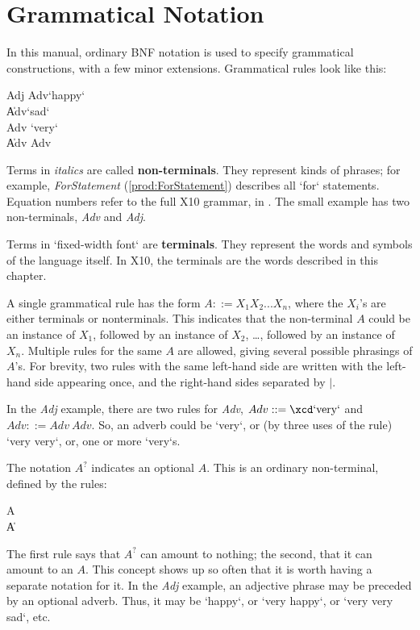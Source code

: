\section{Grammatical Notation}

In this manual, ordinary BNF notation is used to specify grammatical
constructions, with a few minor extensions. 
Grammatical rules look like this: \\
\begin{bbgrammar}
Adj \: Adv\opt \mbox{\xcd`happy`}\\
    \| Adv\opt \mbox{\xcd`sad`}\\ 
Adv \: \mbox{\xcd`very`}\\
    \| Adv Adv 
\end{bbgrammar}

Terms in {\em italics} are called {\bf non-terminals}.  They 
represent kinds of phrases; for example, {\em ForStatement}
(\ref{prod:ForStatement}) describes all \xcd`for` statements.  
Equation numbers refer to the full X10 grammar, in .  
The small example has two non-terminals, {\em Adv} and {\em Adj}.  

Terms in \xcd`fixed-width font` are {\bf terminals}.  They represent the words
and symbols of the language itself.  In X10, the terminals are the words
described in this chapter.

A single grammatical rule has the form {$ A \mathrel{::=} X_1 X_2 ... X_n $},
where the $X_i$'s are either terminals or nonterminals.  This indicates that
the non-terminal $A$ could be an instance of $X_1$, followed by an instance of
$X_2$, \ldots, followed by an instance of $X_n$.  Multiple rules for the same
$A$ are allowed, giving several possible phrasings of $A$'s.  For brevity,
two rules with the same left-hand side are written with the left-hand side
appearing once, and the right-hand sides 
separated by $|$.  

In the {\em Adj} example, there are two rules for {\it Adv}, 
$Adv \mathrel{::=} \mbox{\xcd`very`}$ and
$Adv \mathrel{::=} Adv~Adv$.  So, an adverb could be \xcd`very`, or (by three
uses of the rule) \xcd`very very`, or, one or more \xcd`very`s.  

The notation $A^{?}$ indicates an optional $A$.  This is an ordinary
non-terminal, defined by the rules:\\ 
\begin{bbgrammar}
A\opt \:  \\
    \| A
\end{bbgrammar}
The first rule says that $A^?$ can amount to nothing; the second, that it can
amount to an $A$.  This concept shows up so often that it is worth having a
separate notation for it.  In the {\em Adj} example, an adjective phrase may be
preceded by an optional adverb. Thus, it may be \xcd`happy`, or 
\xcd`very happy`, or \xcd`very very sad`, etc. 
